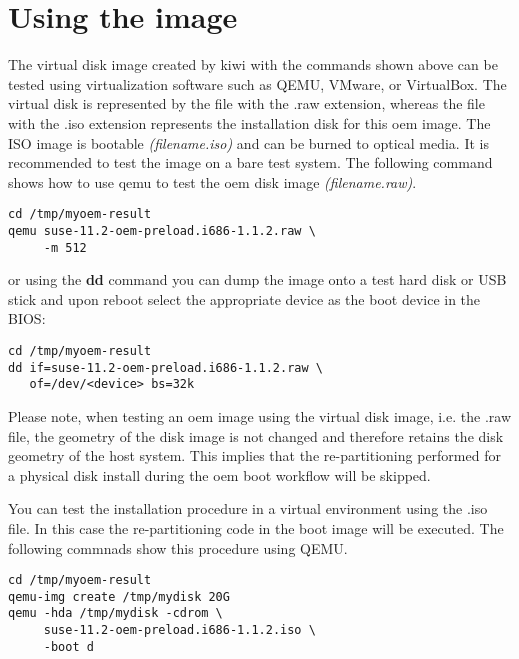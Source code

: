 \section{Using the image}

The virtual disk image created by kiwi with the commands shown above can be 
tested using virtualization software such as QEMU, VMware, or VirtualBox. 
The virtual disk is represented by the file with the .raw extension, whereas 
the file with the .iso extension represents the installation disk for this oem
image. The ISO image is bootable \textit{(filename.iso)} and can be burned to 
optical media. It is recommended to test the image on a bare test system. The 
following command shows how to use qemu to test the oem disk image 
\textit{(filename.raw)}.

\begin{Command}{12cm}
\begin{verbatim}
cd /tmp/myoem-result
qemu suse-11.2-oem-preload.i686-1.1.2.raw \
     -m 512
\end{verbatim}
\end{Command}

or using the \textbf{dd} command you can dump the image onto a test hard 
disk or USB stick and upon reboot select the appropriate device as the 
boot device in the BIOS:

\begin{Command}{12cm}
\begin{verbatim}
cd /tmp/myoem-result
dd if=suse-11.2-oem-preload.i686-1.1.2.raw \
   of=/dev/<device> bs=32k
\end{verbatim}
\end{Command}

Please note, when testing an oem image using the virtual disk image, i.e. 
the .raw file, the geometry of the disk image is not changed and therefore 
retains the disk geometry of the host system. This implies that the 
re-partitioning performed for a physical disk install during the oem boot 
workflow will be skipped.

You can test the installation procedure in a virtual environment using
the .iso file. In this case the re-partitioning code in the boot image will
be executed. The following commnads show this procedure using QEMU.

\begin{Command}{12cm}
\begin{verbatim}
cd /tmp/myoem-result
qemu-img create /tmp/mydisk 20G
qemu -hda /tmp/mydisk -cdrom \
     suse-11.2-oem-preload.i686-1.1.2.iso \
     -boot d
\end{verbatim}
\end{Command}

